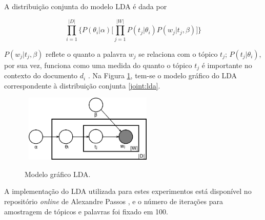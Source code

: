 A distribuição conjunta do modelo LDA é dada por

\begin{equation}
\label{joint:lda}
\ensuremath{\prod_{i=1}^{|D|} \bigg\{P(\theta_i|\alpha)\bigg[\prod_{j=1}^{|W|}P(t_j|\theta_i)P(w_j|t_j,\beta)\bigg]\bigg\}}  
\end{equation}

\ensuremath{P(w_j|t_j,\beta)} reflete o quanto a palavra \ensuremath{w_j} se relaciona com o tópico \ensuremath{t_j}; \ensuremath{P(t_j|\theta_i)}, por sua vez, funciona como uma medida do quanto o tópico \ensuremath{t_j} é importante no contexto do documento \ensuremath{d_i} \cite{pnas}. Na Figura \ref{fig:lda}, tem-se o modelo gráfico do LDA correspondente à distribuição conjunta \ref{joint:lda}. 

\begin{figure}[t]
  \centering %
  \includegraphics[width=6.5cm, height=3.2cm]{Latent_Dirichlet_allocation.png}\\
  \caption{Modelo gráfico LDA.} %
  \label{fig:lda}
\end{figure}

A implementação do LDA utilizada para estes experimentos está disponível no repositório \emph{online} de Alexandre Passos \cite{top-lda}, e o número de iterações para amostragem de tópicos e palavras foi fixado em 100. 





